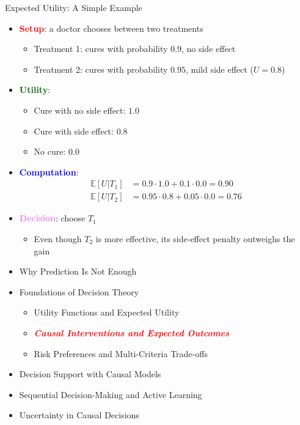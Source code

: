 \documentclass[
  10pt,
  ignorenonframetext,
]{beamer}
\providecommand{\tightlist}{%
  \setlength{\itemsep}{0pt}\setlength{\parskip}{0pt}}
\newcommand{\EE}{\mathbb{E}}
\begin{document}
\begin{frame}{Expected Utility: A Simple Example}
\label{expected-utility-a-simple-example}
\begin{itemize}
\item
  \textbf{\textcolor{red}{Setup}}: a doctor chooses between two
  treatments

  \begin{itemize}
  \tightlist
  \item
    Treatment 1: cures with probability \(0.9\), no side effect
  \item
    Treatment 2: cures with probability \(0.95\), mild side effect
    (\(U = 0.8\))
  \end{itemize}
\item
  \textbf{\textcolor{darkgreen}{Utility}}:

  \begin{itemize}
  \tightlist
  \item
    Cure with no side effect: \(1.0\)
  \item
    Cure with side effect: \(0.8\)
  \item
    No cure: \(0.0\)
  \end{itemize}
\item
  \textbf{\textcolor{blue}{Computation}}: \begin{align*}
  \EE[U | T_1] &= 0.9 \cdot 1.0 + 0.1 \cdot 0.0 = 0.90 \\
  \EE[U | T_2] &= 0.95 \cdot 0.8 + 0.05 \cdot 0.0 = 0.76
  \end{align*}
\item
  \textbf{\textcolor{violet}{Decision}}: choose \(T_1\)

  \begin{itemize}
  \tightlist
  \item
    Even though \(T_2\) is more effective, its side-effect penalty
    outweighs the gain
  \end{itemize}
\end{itemize}
\end{frame}

\begin{frame}{}
\label{section-6}
\begin{itemize}
\tightlist
\item
  Why Prediction Is Not Enough
\item
  Foundations of Decision Theory

  \begin{itemize}
  \tightlist
  \item
    Utility Functions and Expected Utility
  \item
    \emph{\textbf{\textcolor{red}{Causal Interventions and Expected Outcomes}}}
  \item
    Risk Preferences and Multi-Criteria Trade-offs
  \end{itemize}
\item
  Decision Support with Causal Models
\item
  Sequential Decision-Making and Active Learning
\item
  Uncertainty in Causal Decisions
\end{itemize}
\end{frame}
\end{document}

